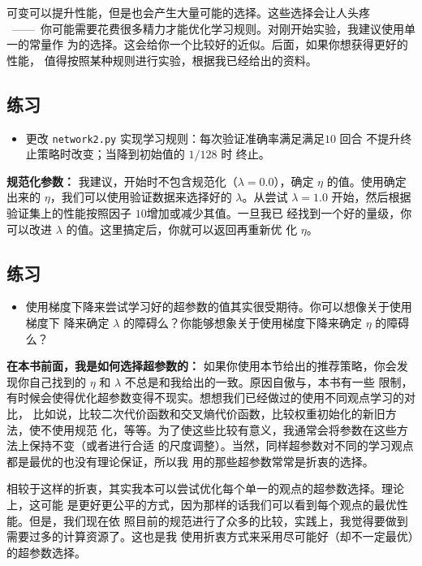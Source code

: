 可变\learningrate{}可以提升性能，但是也会产生大量可能的选择。这些选择会让人头疼
~——~你可能需要花费很多精力才能优化学习规则。对刚开始实验，我建议使用单一的常量作
为\learningrate{}的选择。这会给你一个比较好的近似。后面，如果你想获得更好的性能，
值得按照某种规则进行实验，根据我已经给出的资料。

\subsection*{练习}

\begin{itemize}
\item 更改 \lstinline!network2.py! 实现学习规则：每次验证准确率满足满足$10$ 回合
  不提升终止策略时改变\learningrate{}；当\learningrate{}降到初始值的 $1/128$ 时
  终止。
\end{itemize}

\textbf{规范化参数：} 我建议，开始时不包含规范化（$\lambda=0.0$），确定 $\eta$
的值。使用确定出来的 $\eta$，我们可以使用验证数据来选择好的 $\lambda$。从尝试
$\lambda=1.0$ 开始，然后根据验证集上的性能按照因子 $10$增加或减少其值。一旦我已
经找到一个好的量级，你可以改进 $\lambda$ 的值。这里搞定后，你就可以返回再重新优
化 $\eta$。

\subsection*{练习}

\begin{itemize}
\item 使用梯度下降来尝试学习好的超参数的值其实很受期待。你可以想像关于使用梯度下
  降来确定 $\lambda$ 的障碍么？你能够想象关于使用梯度下降来确定 $\eta$ 的障碍么？
\end{itemize}

\textbf{在本书前面，我是如何选择超参数的：} 如果你使用本节给出的推荐策略，你会发
现你自己找到的 $\eta$ 和 $\lambda$ 不总是和我给出的一致。原因自傲与，本书有一些
限制，有时候会使得优化超参数变得不现实。想想我们已经做过的使用不同观点学习的对比，
比如说，比较二次代价函数和交叉熵代价函数，比较权重初始化的新旧方法，使不使用规范
化，等等。为了使这些比较有意义，我通常会将参数在这些方法上保持不变（或者进行合适
  的尺度调整）。当然，同样超参数对不同的学习观点都是最优的也没有理论保证，所以我
用的那些超参数常常是折衷的选择。

相较于这样的折衷，其实我本可以尝试优化每个单一的观点的超参数选择。理论上，这可能
是更好更公平的方式，因为那样的话我们可以看到每个观点的最优性能。但是，我们现在依
照目前的规范进行了众多的比较，实践上，我觉得要做到需要过多的计算资源了。这也是我
使用折衷方式来采用尽可能好（却不一定最优）的超参数选择。\\

